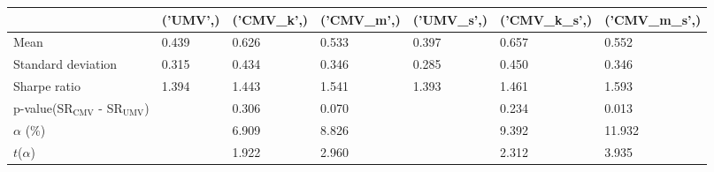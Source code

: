 \begin{tabular}{lllllll}
\toprule
 & ('UMV',) & ('CMV_k',) & ('CMV_m',) & ('UMV_s',) & ('CMV_k_s',) & ('CMV_m_s',) \\
\midrule
Mean & 0.439 & 0.626 & 0.533 & 0.397 & 0.657 & 0.552 \\
Standard deviation & 0.315 & 0.434 & 0.346 & 0.285 & 0.450 & 0.346 \\
Sharpe ratio & 1.394 & 1.443 & 1.541 & 1.393 & 1.461 & 1.593 \\
p-value(SR$_{\text{CMV}}$ - SR$_{\text{UMV}}$) &  & 0.306 & 0.070 &  & 0.234 & 0.013 \\
$\alpha$ (\%) &  & 6.909 & 8.826 &  & 9.392 & 11.932 \\
$t$($\alpha$) &  & 1.922 & 2.960 &  & 2.312 & 3.935 \\
\bottomrule
\end{tabular}

